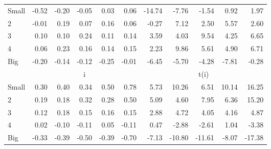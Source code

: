 \begin{table}[!ht]
\begin{tabular}{lrrrrrrrrrr}
    \\
      \cmidrule(r){2-6} \cmidrule(r){7-11}

    Small   & -0.52  & -0.20  & -0.05  & 0.03  & 0.06  & -14.74  & -7.76  & -1.54  & 0.92  & 1.97  \\
         2  & -0.01  & 0.19  & 0.07  & 0.16  & 0.06  & -0.27  & 7.12  & 2.50  & 5.57  & 2.60  \\
         3  & 0.10  & 0.10  & 0.24  & 0.11  & 0.14  & 3.59  & 4.03  & 9.54  & 4.25  & 6.65  \\
         4  & 0.06  & 0.23  & 0.16  & 0.14  & 0.15  & 2.23  & 9.86  & 5.61  & 4.90  & 6.71  \\
    Big     & -0.20  & -0.14  & -0.12  & -0.25  & -0.01  & -6.45  & -5.70  & -4.28  & -7.81  & -0.28  \\

  
    
      & \multicolumn{5}{c}{i} & \multicolumn{5}{c}{t(i)}
    
    \\
      \cmidrule(r){2-6} \cmidrule(r){7-11}

    Small   & 0.30  & 0.40  & 0.34  & 0.50  & 0.78  & 5.73  & 10.26  & 6.51  & 10.14  & 16.25  \\
         2  & 0.19  & 0.18  & 0.32  & 0.28  & 0.50  & 5.09  & 4.60  & 7.95  & 6.36  & 15.20  \\
         3  & 0.12  & 0.18  & 0.15  & 0.16  & 0.15  & 2.88  & 4.72  & 4.05  & 4.16  & 4.87  \\
         4  & 0.02  & -0.10  & -0.11  & 0.05  & -0.11  & 0.47  & -2.88  & -2.61  & 1.04  & -3.38  \\
    Big     & -0.33  & -0.39  & -0.50  & -0.39  & -0.70  & -7.13  & -10.80  & -11.61  & -8.07  & -17.38  \\

  

  \bottomrule
\end{tabular}
\label{tbl:25_Size_BM_FF2015}
\end{table}